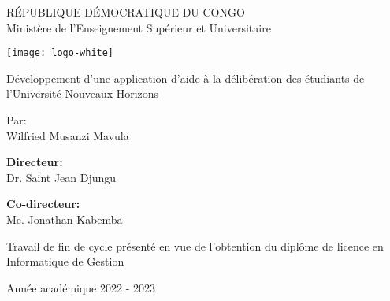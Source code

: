 \begin{center}
    \uppercase{République Démocratique du Congo} \\ \vspace*{0.2cm}
    Ministère de l'Enseignement Supérieur et Universitaire \\ \vspace*{0.4cm}

    \texttt{[image: logo-white]}

    \vspace{2cm}
    \Large{Développement d'une application d'aide à la délibération des étudiants de l'Université Nouveaux Horizons}

    \vspace{2cm}
    Par: \\
    Wilfried Musanzi Mavula

    \vspace{2cm}
    \textbf{Directeur:} \\
    Dr. Saint Jean Djungu

    \vspace{1cm}
    \textbf{Co-directeur:} \\
    Me. Jonathan Kabemba

    \vspace{2cm}
    Travail de fin de cycle présenté en vue de l'obtention du diplôme de licence en Informatique de Gestion

    \vspace{3cm}
    Année académique 2022 - 2023






    



\end{center}
